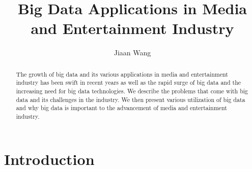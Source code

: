 \documentclass[sigconf]{acmart}
\begin{document}
\title{Big Data Applications in Media and Entertainment Industry}


\author{Jiaan Wang}


\begin{abstract}

    The growth of big data and its various applications in media and entertainment 
    industry has been swift in recent years as well as the rapid surge of big data 
    and the increasing need for big data technologies. We describe the problems 
    that come with big data and its challenges in the industry. We then present 
    various utilization of big data and why big data is important to the advancement 
    of media and entertainment industry. 
    
\end{abstract}


\maketitle

\section{Introduction}
\end{document}
